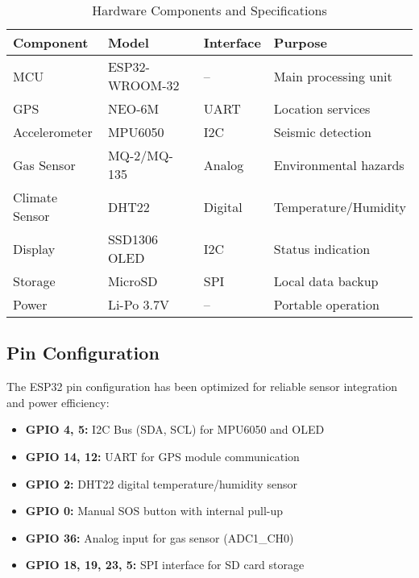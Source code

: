 \documentclass[conference]{IEEEtran}
\begin{document}
\begin{table}[htbp]
\centering
\small %
\setlength{\tabcolsep}{2pt} %
\renewcommand{\arraystretch}{1.2} %
\caption{Hardware Components and Specifications}
\label{tab:hardware_specs}
\begin{tabular}{|p{2.3cm}|p{2.5cm}|p{1.5cm}|p{1.8cm}|}
\hline
\textbf{Component} & \textbf{Model} & \textbf{Interface} & \textbf{Purpose} \\
\hline
MCU & ESP32-WROOM-32 & -- & Main processing unit \\
\hline
GPS & NEO-6M & UART & Location services \\
\hline
Accelerometer & MPU6050 & I2C & Seismic detection \\
\hline
Gas Sensor & MQ-2/MQ-135 & Analog & Environmental hazards \\
\hline
Climate Sensor & DHT22 & Digital & Temperature/\newline Humidity \\
\hline
Display & SSD1306 OLED & I2C & Status indication \\
\hline
Storage & MicroSD & SPI & Local data backup \\
\hline
Power & Li-Po 3.7V & -- & Portable operation \\
\hline
\end{tabular}
\end{table}


\subsection{Pin Configuration}

The ESP32 pin configuration has been optimized for reliable sensor integration and power efficiency:

\begin{itemize}
\item \textbf{GPIO 4, 5:} I2C Bus (SDA, SCL) for MPU6050 and OLED
\item \textbf{GPIO 14, 12:} UART for GPS module communication
\item \textbf{GPIO 2:} DHT22 digital temperature/humidity sensor
\item \textbf{GPIO 0:} Manual SOS button with internal pull-up
\item \textbf{GPIO 36:} Analog input for gas sensor (ADC1\_CH0)
\item \textbf{GPIO 18, 19, 23, 5:} SPI interface for SD card storage
\end{itemize}
\end{document}
